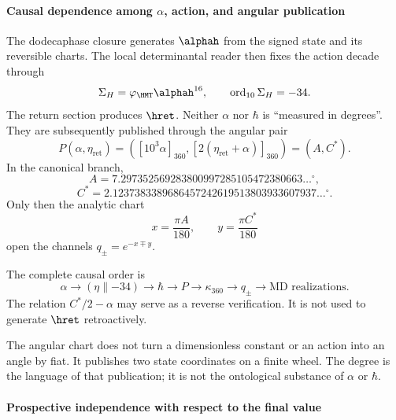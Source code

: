 \paragraph{Causal dependence among \(\alpha\), action, and angular publication}

The dodecaphase closure generates \(\alphah\) from the signed state and its
reversible charts. The local determinantal reader then fixes the action decade
through
\[
\Sigma_H=\varphi_{\HMT}\alphah^{16},
\qquad \operatorname{ord}_{10}\Sigma_H=-34.
\]
The return section produces \(\hret\). Neither \(\alpha\) nor \(\hbar\) is
\enquote{measured in degrees}. They are subsequently published through the angular pair
\begin{equation}
P(\alpha,\eta_{\mathrm{ret}})=
\left([10^3\alpha]_{360},[2(\eta_{\mathrm{ret}}+\alpha)]_{360}\right)
=(A,C^*).
\label{eq:parangular}
\end{equation}
In the canonical branch,
\[
A=7.297352569283800997285105472380663\ldots{}^\circ,
\]
\[
C^*=2.1237383389686457242619513803933607937\ldots{}^\circ.
\]
Only then the analytic chart
\[
x=\frac{\pi A}{180},\qquad y=\frac{\pi C^*}{180}
\]
open the channels \(q_\pm=e^{-x\mp y}\).

The complete causal order is
\[
\alpha\to(\eta\parallel-34)\to\hbar
\to P\to\kappa_{360}\to q_\pm
\to\text{MD realizations}.
\]
The relation \(C^*/2-\alpha\) may serve as a reverse verification. It is not used
to generate \(\hret\) retroactively.

\begin{narrativebox}
The angular chart does not turn a dimensionless constant or an action into
an angle by fiat. It publishes two state coordinates on a finite wheel. The
degree is the language of that publication; it is not the ontological
substance of \(\alpha\) or \(\hbar\).
\end{narrativebox}
\paragraph{Prospective independence with respect to the final value}

